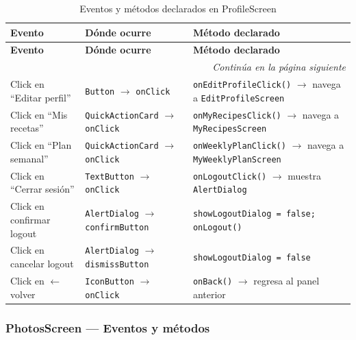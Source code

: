 \documentclass[stu, 12pt, letterpaper, donotrepeattitle, floatsintext, natbib]{apa7}
\begin{document}
\begin{longtable}{@{}p{2.5cm}p{4cm}p{9cm}@{}}
\caption{Eventos y métodos declarados en ProfileScreen}
\label{tab:evprofile}\\
\toprule
\textbf{Evento} & \textbf{Dónde ocurre} & \textbf{Método declarado} \\
\midrule
\endfirsthead
\toprule
\textbf{Evento} & \textbf{Dónde ocurre} & \textbf{Método declarado} \\
\midrule
\endhead
\midrule
\multicolumn{3}{r}{\small\textit{Continúa en la página siguiente}}\\
\endfoot
\bottomrule
\endlastfoot
Click en ``Editar perfil'' & \texttt{Button} $\rightarrow$ \texttt{onClick} & \texttt{onEditProfileClick()} $\rightarrow$ navega a \texttt{EditProfileScreen} \\[3pt]
Click en ``Mis recetas'' & \texttt{QuickActionCard} $\rightarrow$ \texttt{onClick} & \texttt{onMyRecipesClick()} $\rightarrow$ navega a \texttt{MyRecipesScreen} \\[3pt]
Click en ``Plan semanal'' & \texttt{QuickActionCard} $\rightarrow$ \texttt{onClick} & \texttt{onWeeklyPlanClick()} $\rightarrow$ navega a \texttt{MyWeeklyPlanScreen} \\[3pt]
Click en ``Cerrar sesión'' & \texttt{TextButton} $\rightarrow$ \texttt{onClick} & \texttt{onLogoutClick()} $\rightarrow$ muestra \texttt{AlertDialog} \\[3pt]
Click en confirmar logout & \texttt{AlertDialog} $\rightarrow$ \texttt{confirmButton} & \texttt{showLogoutDialog = false; onLogout()} \\[3pt]
Click en cancelar logout & \texttt{AlertDialog} $\rightarrow$ \texttt{dismissButton} & \texttt{showLogoutDialog = false} \\[3pt]
Click en $\leftarrow$ volver & \texttt{IconButton} $\rightarrow$ \texttt{onClick} & \texttt{onBack()} $\rightarrow$ regresa al panel anterior \\
\end{longtable}

\subsubsection{PhotosScreen --- Eventos y métodos}
\end{document}
